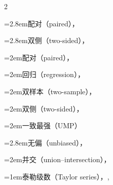 \begin{multicols}{2}
\par\noindent\hangindent=2.8em\hspace*{1.8em}\label{idx:1020}配对（paired），\hyperref[exercise:8.40]{\pageref*{exercise:8.40}}\par
\par\noindent\hangindent=2.8em\hspace*{1.8em}\label{idx:1021}双侧（two-sided），\hyperref[ex:8.2.8]{\pageref*{ex:8.2.8}}\par
\par\noindent\hangindent=2em\hspace*{1em}\label{idx:1022}配对（paired），\hyperref[exercise:8.39]{\pageref*{exercise:8.39}}\par
\par\noindent\hangindent=2em\hspace*{1em}\label{idx:1023}回归（regression），\hyperref[eq:11.3.38]{\pageref*{eq:11.3.38}}\par
\par\noindent\hangindent=2em\hspace*{1em}\label{idx:1024}双样本（two-sample），\hyperref[exercise:8.41]{\pageref*{exercise:8.41}}\par
\par\noindent\hangindent=2em\hspace*{1em}\label{idx:1025}双侧（two-sided），\hyperref[exercise:8.41]{\pageref*{exercise:8.41}}\par
{}
\par\noindent\hangindent=2em\hspace*{1em}\label{idx:1026}一致最强（UMP）\par
\par\noindent\hangindent=2.8em\hspace*{1.8em}\label{idx:1027}无偏（unbiased），\hyperref[exercise:8.37]{\pageref*{exercise:8.37}}\par
\par\noindent\hangindent=2em\hspace*{1em}\label{idx:1028}并交（union–intersection），\hyperref[ex:8.3.8]{\pageref*{ex:8.3.8}}\par
\par\addvspace{2pt}
\par\noindent\hangindent=1em\hspace*{0em}\label{idx:1029}泰勒级数（Taylor series），\hyperref[def:5.5.20]{\pageref*{def:5.5.20}}, \hyperref[idxocc:1029:423]{\pageref*{idxocc:1029:423}}\par

\end{multicols}
